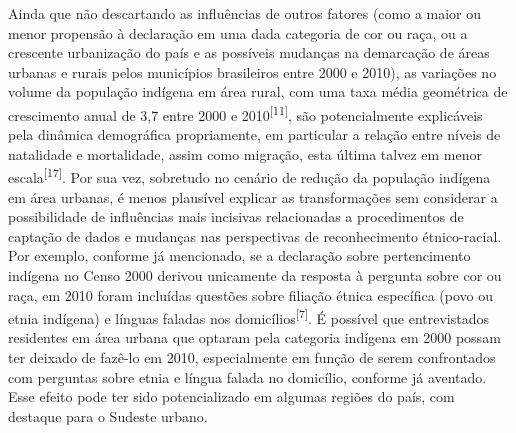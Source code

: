 \documentclass{article}
\begin{document}
Ainda que não descartando as influências de outros fatores (como a maior ou
menor propensão à declaração em uma dada categoria de cor ou raça, ou a
crescente urbanização do país e as possíveis mudanças na demarcação de áreas
urbanas e rurais pelos municípios brasileiros entre 2000 e 2010), as variações
no volume da população indígena em área rural, com uma taxa média geométrica de
crescimento anual de 3,7 entre 2000 e 2010\textsuperscript{[}\textsuperscript{11}\textsuperscript{]}, são potencialmente explicáveis pela dinâmica demográfica propriamente, em
particular a relação entre níveis de natalidade e mortalidade, assim como
migração, esta última talvez em menor escala\textsuperscript{[}\textsuperscript{17}\textsuperscript{]}. Por sua vez, sobretudo no cenário de redução da população indígena em área
urbanas, é menos plausível explicar as transformações sem considerar a
possibilidade de influências mais incisivas relacionadas a procedimentos de
captação de dados e mudanças nas perspectivas de reconhecimento étnico-racial.
Por exemplo, conforme já mencionado, se a declaração sobre pertencimento
indígena no Censo 2000 derivou unicamente da resposta à pergunta sobre cor ou
raça, em 2010 foram incluídas questões sobre filiação étnica específica (povo ou
etnia indígena) e línguas faladas nos domicílios\textsuperscript{[}\textsuperscript{7}\textsuperscript{]}. É possível que entrevistados residentes em área urbana que optaram pela
categoria indígena em 2000 possam ter deixado de fazê-lo em 2010, especialmente
em função de serem confrontados com perguntas sobre etnia e língua falada no
domicílio, conforme já aventado. Esse efeito pode ter sido potencializado em
algumas regiões do país, com destaque para o Sudeste urbano.
\end{document}
